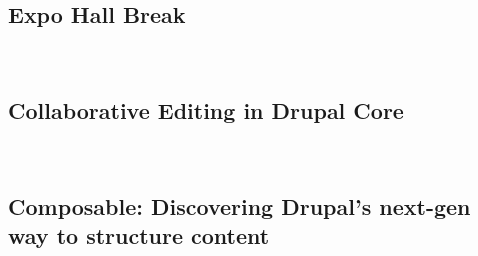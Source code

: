 \subsection[14:20-15:00 Expo Hall break]{Expo Hall Break}\label{subsec:breakd1b2}
 \\

\subsection[15:00-15:50: Collaborative Editing in Drupal Core]{Collaborative Editing in Drupal Core}\label{subsec:session3}
 \\

\subsection[16:10-17:00: Composable: Discovering Drupal’s next-gen way to structure content]{Composable: Discovering Drupal’s next-gen way to structure content}\label{subsec:session4}
 \\

\newpage
